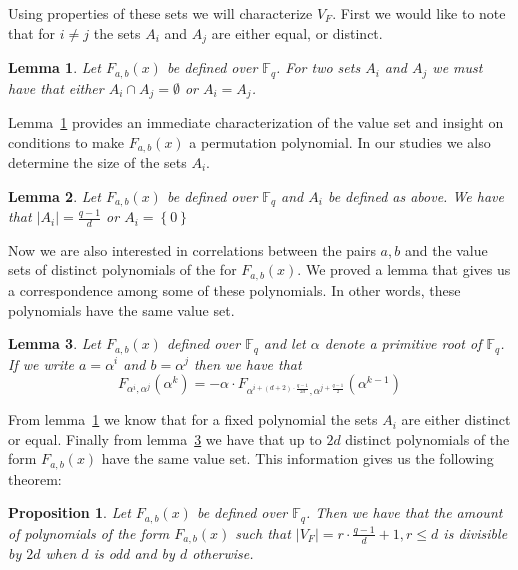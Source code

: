\documentclass[landscape,final,paperwidth=48in,paperheight=38in]{baposter}
\newtheorem{proposition}{Proposition}
\newtheorem{lemma}{Lemma}
\begin{document}
\begin{poster}
{\begin{multicols}{2}
    Using properties of these sets we will characterize $V_{F}$. First we would like to note that for $i \neq j$ the sets $A_i$ and $A_j$ are either equal, or distinct.

    \begin{lemma}\label{conjuntos_disjuntos}
      Let $F_{a,b}(x)$ be defined over $\mathbb{F}_{q}$. For two sets $A_i$ and $A_j$ we must have that either $A_i \cap A_j = \emptyset$ or $A_i = A_j$.
    \end{lemma}

    Lemma~\ref{conjuntos_disjuntos} provides an immediate characterization of the value set and insight on conditions to make $F_{a,b}(x)$ a permutation polynomial. In our studies we also determine the size of the sets $A_i$.

    \begin{lemma}\label{tamanos_conjuntos}
      Let $F_{a,b}(x)$ be defined over $\mathbb{F}_{q}$ and $A_i$ be defined as above. We have that $\left\vert A_i \right\vert = \frac{q-1}{d}$ or $A_i = \left\{ 0 \right\}$
    \end{lemma}

    Now we are also interested in correlations between the pairs $a,b$ and the value sets of distinct polynomials of the for $F_{a,b}(x)$. We proved a lemma that gives us a correspondence among some of these polynomials. In other words, these polynomials have the same value set.

    \begin{lemma}\label{correspondencia}
      Let $F_{a,b}(x)$ defined over $\mathbb{F}_{q}$ and let $\alpha$ denote a primitive root of $\mathbb{F}_{q}$. If we write $a = \alpha^i$ and $b = \alpha^j$ then we have that
      $$F_{\alpha^i,\alpha^j}(\alpha^k) = -\alpha \cdot F_{\alpha^{i+(d+2)\cdot \frac{q-1}{2d}}, \alpha^{j+\frac{q-1}{2}}}(\alpha^{k-1})$$
    \end{lemma}

    From lemma~\ref{conjuntos_disjuntos} we know that for a fixed polynomial the sets $A_i$ are either distinct or equal. Finally from lemma~\ref{correspondencia} we have that up to $2d$ distinct polynomials of the form $F_{a,b}(x)$ have the same value set. This information gives us the following theorem:

    \begin{proposition}\label{el_teorema}
      Let $F_{a,b}(x)$ be defined over $\mathbb{F}_{q}$. Then we have that the amount of polynomials of the form $F_{a,b}(x)$ such that $\left\vert V_{F} \right\vert = r\cdot \frac{q-1}{d} + 1, r \leq d$ is divisible by $2d$ when $d$ is odd and by $d$ otherwise.
    \end{proposition}


\end{multicols}}
\end{poster}
\end{document}
